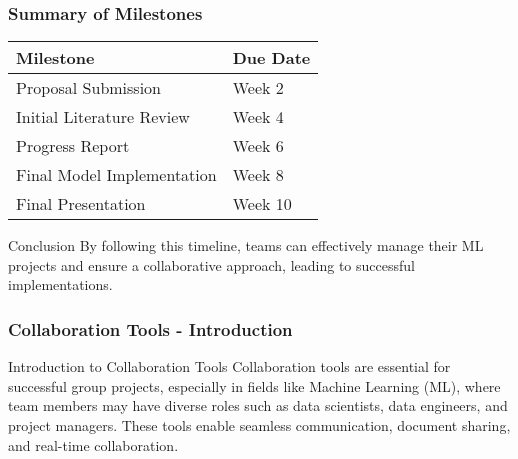 \documentclass[aspectratio=169]{beamer}
\begin{document}
\begin{frame}[fragile]
    \frametitle{Summary of Milestones}
    \begin{table}[htp]
        \centering
        \begin{tabular}{|l|l|}
            \hline
            \textbf{Milestone} & \textbf{Due Date} \\
            \hline
            Proposal Submission & Week 2 \\
            Initial Literature Review & Week 4 \\
            Progress Report & Week 6 \\
            Final Model Implementation & Week 8 \\
            Final Presentation & Week 10 \\
            \hline
        \end{tabular}
    \end{table}

    \begin{block}{Conclusion}
        By following this timeline, teams can effectively manage their ML projects and ensure a collaborative approach, leading to successful implementations.
    \end{block}
\end{frame}

\begin{frame}[fragile]
    \frametitle{Collaboration Tools - Introduction}
    \begin{block}{Introduction to Collaboration Tools}
        Collaboration tools are essential for successful group projects, especially in fields like Machine Learning (ML), where team members may have diverse roles such as data scientists, data engineers, and project managers. These tools enable seamless communication, document sharing, and real-time collaboration.
    \end{block}
\end{frame}
\end{document}
